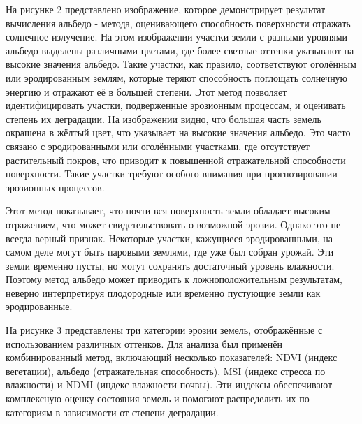 \begin{multicols}{2}
На рисунке 2 представлено изображение, которое демонстрирует результат
вычисления альбедо - метода, оценивающего способность поверхности
отражать солнечное излучение. На этом изображении участки земли с
разными уровнями альбедо выделены различными цветами, где более светлые
оттенки указывают на высокие значения альбедо. Такие участки, как
правило, соответствуют оголённым или эродированным землям, которые
теряют способность поглощать солнечную энергию и отражают её в большей
степени. Этот метод позволяет идентифицировать участки, подверженные
эрозионным процессам, и оценивать степень их деградации. На изображении
видно, что большая часть земель окрашена в жёлтый цвет, что указывает на
высокие значения альбедо. Это часто связано с эродированными или
оголёнными участками, где отсутствует растительный покров, что приводит
к повышенной отражательной способности поверхности. Такие участки
требуют особого внимания при прогнозировании эрозионных процессов.

Этот метод показывает, что почти вся поверхность земли обладает высоким
отражением, что может свидетельствовать о возможной эрозии. Однако это
не всегда верный признак. Некоторые участки, кажущиеся эродированными,
на самом деле могут быть паровыми землями, где уже был собран урожай.
Эти земли временно пусты, но могут сохранять достаточный уровень
влажности. Поэтому метод альбедо может приводить к ложноположительным
результатам, неверно интерпретируя плодородные или временно пустующие
земли как эродированные.

На рисунке 3 представлены три категории эрозии земель, отображённые с
использованием различных оттенков. Для анализа был применён
комбинированный метод, включающий несколько показателей: NDVI (индекс
вегетации), альбедо (отражательная способность), MSI (индекс стресса по
влажности) и NDMI (индекс влажности почвы). Эти индексы обеспечивают
комплексную оценку состояния земель и помогают распределить их по
категориям в зависимости от степени деградации.
\end{multicols}

